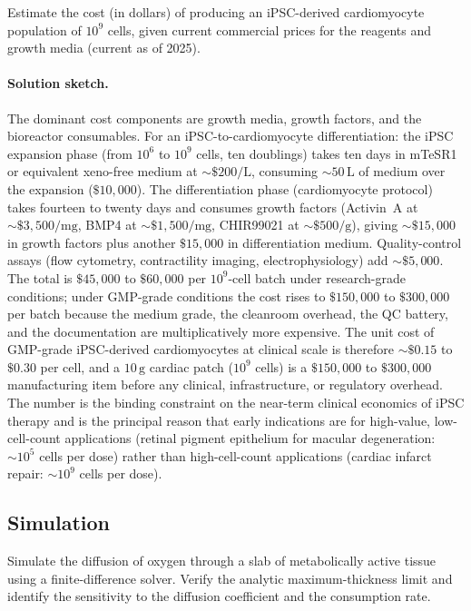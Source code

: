 \begin{exercise}
Estimate the cost (in dollars) of producing an iPSC-derived
cardiomyocyte population of $10^9$ cells, given current commercial
prices for the reagents and growth media (current as of 2025).
\end{exercise}

\paragraph{Solution sketch.} The dominant cost components are
growth media, growth factors, and the bioreactor consumables.
For an iPSC-to-cardiomyocyte differentiation: the iPSC expansion
phase (from $10^6$ to $10^9$ cells, ten doublings) takes ten days
in mTeSR1 or equivalent xeno-free medium at $\sim \$200/\text{L}$,
consuming $\sim 50\,\text{L}$ of medium over the expansion
($\$10{,}000$). The differentiation phase (cardiomyocyte protocol)
takes fourteen to twenty days and consumes growth factors
(Activin~A at $\sim \$3{,}500/\text{mg}$, BMP4 at
$\sim \$1{,}500/\text{mg}$, CHIR99021 at $\sim \$500/\text{g}$),
giving $\sim \$15{,}000$ in growth factors plus another
$\$15{,}000$ in differentiation medium. Quality-control assays
(flow cytometry, contractility imaging, electrophysiology) add
$\sim \$5{,}000$. The total is $\$45{,}000$ to $\$60{,}000$ per
$10^9$-cell batch under research-grade conditions; under
GMP-grade conditions the cost rises to $\$150{,}000$ to
$\$300{,}000$ per batch because the medium grade, the cleanroom
overhead, the QC battery, and the documentation are
multiplicatively more expensive. The unit cost of GMP-grade
iPSC-derived cardiomyocytes at clinical scale is therefore
$\sim \$0.15$ to $\$0.30$ per cell, and a $10\,\text{g}$ cardiac
patch ($10^9$ cells) is a $\$150{,}000$ to $\$300{,}000$
manufacturing item before any clinical, infrastructure, or
regulatory overhead. The number is the binding constraint on the
near-term clinical economics of iPSC therapy and is the principal
reason that early indications are for high-value, low-cell-count
applications (retinal pigment epithelium for macular degeneration:
$\sim 10^5$ cells per dose) rather than high-cell-count
applications (cardiac infarct repair: $\sim 10^9$ cells per dose).

\subsection*{Simulation}

\begin{exercise}
Simulate the diffusion of oxygen through a slab of metabolically
active tissue using a finite-difference solver. Verify the analytic
maximum-thickness limit and identify the sensitivity to the diffusion
coefficient and the consumption rate.
\end{exercise}

